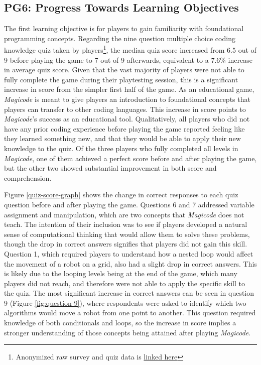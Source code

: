\documentclass[10pt,twocolumn]{article}
\begin{document}
\subsection{PG6: Progress Towards Learning Objectives}
The first learning objective is for players to gain familiarity with foundational programming concepts. Regarding the nine question multiple choice coding knowledge quiz taken by players\footnote{Anonymized raw survey and quiz data is \href{https://docs.google.com/spreadsheets/d/1F7b50xaFvfE2F1knakdCm4rHaRKITp1pA6s78goNYoM/edit?usp=sharing}{linked here}}, the median quiz score increased from 6.5 out of 9 before playing the game to 7 out of 9 afterwards, equivalent to a 7.6\% increase in average quiz score. Given that the vast majority of players were not able to fully complete the game during their playtesting session, this is a significant increase in score from the simpler first half of the game. As an educational game, \textit{Magicode} is meant to give players an introduction to foundational concepts that players can transfer to other coding languages. This increase in score points to \textit{Magicode}’s success as an educational tool. Qualitatively, all players who did not have any prior coding experience before playing the game reported feeling like they learned something new, and that they would be able to apply their new knowledge to the quiz. Of the three players who fully completed all levels in \textit{Magicode}, one of them achieved a perfect score before and after playing the game, but the other two showed substantial improvement in both score and comprehension.

Figure \ref{quiz-score-graph} shows the change in correct responses to each quiz question before and after playing the game. Questions 6 and 7 addressed variable assignment and manipulation, which are two concepts that \textit{Magicode} does not teach. The intention of their inclusion was to see if players developed a natural sense of computational thinking that would allow them to solve these problems, though the drop in correct answers signifies that players did not gain this skill. Question 1, which required players to understand how a nested loop would affect the movement of a robot on a grid, also had a slight drop in correct answers. This is likely due to the looping levels being at the end of the game, which many players did not reach, and therefore were not able to apply the specific skill to the quiz. The most significant increase in correct answers can be seen in question 9 (Figure \ref{fig:question-9}), where respondents were asked to identify which two algorithms would move a robot from one point to another. This question required knowledge of both conditionals and loops, so the increase in score implies a stronger understanding of those concepts being attained after playing \textit{Magicode}.
\end{document}
